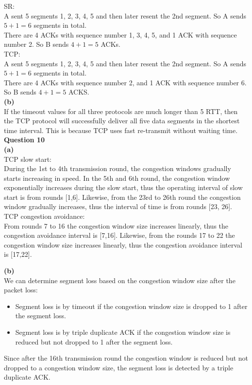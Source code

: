 \documentclass{article}
\begin{document}
SR:\\
A sent 5 segments 1, 2, 3, 4, 5 and then later resent the 2nd segment. So A sends $5+1=6$ segments in total.\\
There are 4 ACKs with sequence number 1, 3, 4, 5, and 1 ACK with sequence number 2. So B sends $4+1=5$ ACKs.\\

TCP:\\
A sent 5 segments 1, 2, 3, 4, 5 and then later resent the 2nd segment. So A sends $5+1=6$ segments in total.\\
There are 4 ACKs with sequence number 2, and 1 ACK with sequence number 6. So B sends $4+1=5$ ACKS.\\

{\bf (b)}\\
If the timeout values for all three protocols are much longer than 5 RTT, then the TCP protocol  will successfully deliver all five data segments in the shortest time interval. This is because TCP uses fast re-transmit without waiting time.\\

{\bf Question 10}\\
{\bf (a)}\\
TCP slow start:\\
During the 1st to 4th transmission round, the congestion windows gradually starts increasing in speed. In the 5th and 6th round, the congestion window exponentially increases during the slow start, thus the operating interval of slow start is from rounds [1,6]. Likewise, from the 23rd to 26th round the congestion window gradually increases, thus the interval of time is from rounds [23, 26].\\

TCP congestion avoidance:\\
From rounds 7 to 16 the congestion window size increases linearly, thus the congestion avoidance interval is [7,16]. Likewise, from the rounds 17 to 22 the congestion window size increases linearly, thus the congestion avoidance interval is [17,22].

\bigskip
{\bf (b)}\\
We can determine segment loss based on the congestion window size after the packet loss:\\
\begin{itemize}
    \item Segment loss is by timeout if the congestion window size is dropped to 1 after the segment loss.
    \item Segment loss is by triple duplicate ACK if the congestion window size is reduced but not dropped to 1 after the segment loss.
\end{itemize}
Since after the 16th transmission round the congestion window is reduced but not dropped to a congestion window size, the segment loss is detected by a triple duplicate ACK.
\end{document}
